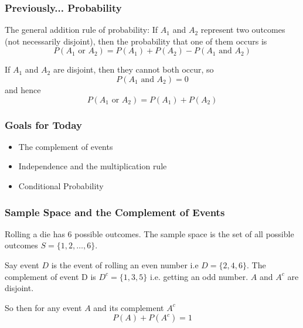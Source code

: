 \documentclass[slides]{beamer}
\newcommand{\blue}[1]{\textcolor{blue2}{#1}}
\begin{document}
\begin{frame}
\frametitle{Previously... Probability}

\blue{The general addition rule of probability}: If $A_1$ and $A_2$ represent two outcomes (not necessarily disjoint), then the probability that one of them occurs is
\[
P(A_1 \mbox{ or } A_2) = P(A_1) + P(A_2) - P(A_1 \mbox{ and } A_2)
\]

\pause If $A_1$ and $A_2$ are disjoint, then they cannot both occur, so 
\[
P(A_1 \mbox{ and } A_2)=0
\]
\pause and hence
\[
P(A_1 \mbox{ or } A_2) = P(A_1) + P(A_2)
\]

\end{frame}


\begin{frame}[fragile]
\frametitle{Goals for Today}
\begin{itemize}
\item The complement of events
\item Independence and the multiplication rule
\item Conditional Probability
\end{itemize}

\end{frame}



\begin{frame}
\frametitle{Sample Space and the Complement of Events}
Rolling a die has 6 possible outcomes.  The \blue{sample space} is the set of all possible outcomes $S = \{1, 2, \ldots, 6\}$.  

\pause \vspace{0.75cm}
Say event $D$ is the event of rolling an even number i.e $D=\{2, 4, 6\}$.  The \blue{complement of event} D is $D^c=\{1, 3, 5\}$ i.e. getting an odd number.  $A$ and $A^c$ are disjoint.  

\pause \vspace{0.75cm}
So then for any event $A$ and its complement $A^c$
\[
P(A) + P(A^c) = 1
\]

\end{frame}
\end{document}
